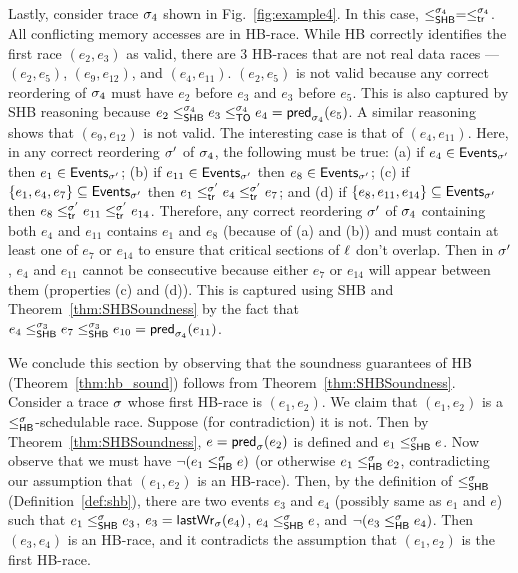 \begin{example}
Lastly, consider trace $\sigma_4$ shown in Fig.~\ref{fig:example4}. In
this case, $\leq^{\sigma_4}_{\mathsf{SHB}} = \leq^{\sigma_4}_{\mathsf{tr}}$. All conflicting memory
accesses are in HB-race.  While HB correctly identifies the first race
$(e_2, e_3)$ as valid, there are 3 HB-races that are not real data
races --- $(e_2,e_5)$, $(e_9,e_{12})$, and $(e_4,e_{11})$. $(e_2,e_5)$
is not valid because any correct reordering of $\sigma_4$ must have $e_2$
before $e_3$ and $e_3$ before $e_5$. This is also captured by SHB
reasoning because $e_2 \leq^{\sigma_4}_{\mathsf{SHB}} e_3 \leq^{\sigma_4}_{\mathsf{TO}} e_4
= \mathsf{pred}_{\sigma_4}(e_5)$. A similar reasoning shows that $(e_9,e_{12})$ is
not valid. The interesting case is that of $(e_4,e_{11})$. Here, in
any correct reordering $\sigma'$ of $\sigma_4$, the following must be true:
(a) if $e_4 \in \mathsf{Events}_{\sigma'}$ then $e_1 \in \mathsf{Events}_{\sigma'}$; (b) if
$e_{11} \in \mathsf{Events}_{\sigma'}$ then $e_8 \in \mathsf{Events}_{\sigma'}$; (c) if
$\{e_1,e_4,e_7\} \subseteq \mathsf{Events}_{\sigma'}$ then $e_1 \leq^{\sigma'}_{\mathsf{tr}}
e_4 \leq^{\sigma'}_{\mathsf{tr}} e_7$; and (d) if
$\{e_8,e_{11},e_{14}\} \subseteq \mathsf{Events}_{\sigma'}$ then $e_8 \leq^{\sigma'}_{\mathsf{tr}}
e_{11} \leq^{\sigma'}_{\mathsf{tr}} e_{14}$. Therefore, any correct reordering $\sigma'$
of $\sigma_4$ containing both $e_4$ and $e_{11}$ contains $e_1$ and $e_8$
(because of (a) and (b)) and must contain at least one of $e_7$ or
$e_{14}$ to ensure that critical sections of $\ell$ don't overlap. Then
in $\sigma'$, $e_4$ and $e_{11}$ cannot be consecutive because either
$e_7$ or $e_{14}$ will appear between them (properties (c) and
(d)). This is captured using SHB and Theorem~\ref{thm:SHBSoundness} by
the fact that $e_4 \leq^{\sigma_3}_{\mathsf{SHB}} e_7 \leq^{\sigma_3}_{\mathsf{SHB}} e_{10}
= \mathsf{pred}_{\sigma_4}(e_{11})$.
\end{example}

We conclude this section by observing that the soundness guarantees of
HB (Theorem~\ref{thm:hb_sound}) follows from
Theorem~\ref{thm:SHBSoundness}. Consider a trace $\sigma$ whose first
HB-race is $(e_1,e_2)$. We claim that $(e_1,e_2)$ is a
$\leq^{\sigma}_{\mathsf{HB}}$-schedulable race. Suppose (for contradiction) it is
not. Then by Theorem~\ref{thm:SHBSoundness}, $e = \mathsf{pred}_{\sigma}(e_2)$ is
defined and $e_1 \leq^{\sigma}_{\mathsf{SHB}} e$.  Now observe that we must have
$\neg(e_1 \leq^{\sigma}_{\mathsf{HB}} e)$ (or otherwise $e_1 \leq^{\sigma}_{\mathsf{HB}} e_2$, contradicting
our assumption that $(e_1, e_2)$ is an HB-race).  Then, by the
definition of $\leq^{\sigma}_{\mathsf{SHB}}$ (Definition~\ref{def:shb}), there are two
events $e_3$ and $e_4$ (possibly same as $e_1$ and $e$) such that
$e_1 \leq^{\sigma}_{\mathsf{SHB}} e_3$, $e_3 = \mathsf{lastWr}_{\sigma}(e_4)$, $e_4 \leq^{\sigma}_{\mathsf{SHB}} e$, and
$\neg (e_3 \leq^{\sigma}_{\mathsf{HB}} e_4)$.  Then $(e_3,e_4)$ is an HB-race, and it
contradicts the assumption that $(e_1,e_2)$ is the first HB-race.

